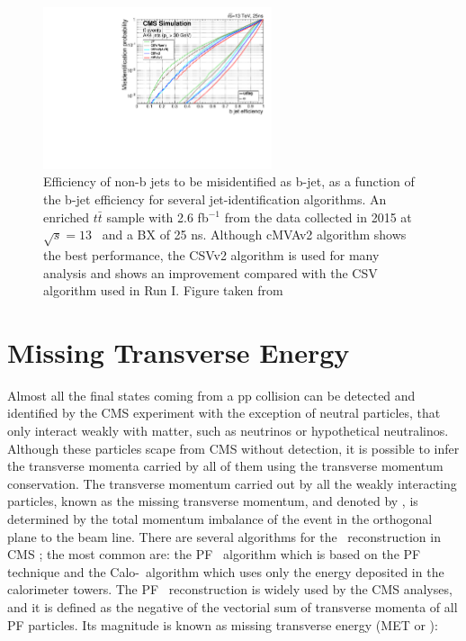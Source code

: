 \begin{figure}[ht]%
  \begin{center}
    \includegraphics[width=0.6\textwidth]{figuras/Chapter3/bjet_performance_algos.pdf}
    \caption{Efficiency of non-b jets to be misidentified as b-jet, as a function of the b-jet efficiency 
	     for several jet-identification algorithms. An enriched $t\bar{t}$ sample with 2.6 fb$^{-1}$ 
	     from the data collected in 2015 at $\sqrt{s}=13$ \TeV~and a BX of 25 ns. Although cMVAv2 algorithm 
             shows the best performance, the CSVv2 algorithm is used for many analysis and shows 
             an improvement compared with the CSV algorithm used in Run I. Figure taken from \cite{bjetWP}}
    \label{fig:bjetRun1vsRun2}
  \end{center}
\end{figure}


\section{Missing Transverse Energy}
\label{sec:MET}

Almost all the final states coming from a pp collision 
can be detected and identified by the CMS experiment
with the exception of neutral particles, that only interact
weakly with matter, such as neutrinos or hypothetical 
neutralinos. Although these particles scape from CMS without detection, it is possible 
to infer the transverse momenta carried by all of them using the 
transverse momentum conservation. The transverse momentum carried 
out by all the weakly interacting particles, known as the missing 
transverse momentum, and denoted by \METv, is determined by the total 
momentum imbalance of the event in the orthogonal plane to the beam 
line. There are several algorithms for the \METv~reconstruction 
in CMS \cite{METPerformance}; the most common are: the PF \METv~algorithm 
which is based on the PF technique  and the Calo-\METv~algorithm which uses only
the energy deposited in the calorimeter towers. The PF \METv~reconstruction is widely 
used by the CMS analyses, and it is defined as the negative of the 
vectorial sum of transverse momenta of all PF particles. Its 
magnitude is known as missing transverse energy (MET or \MET):

